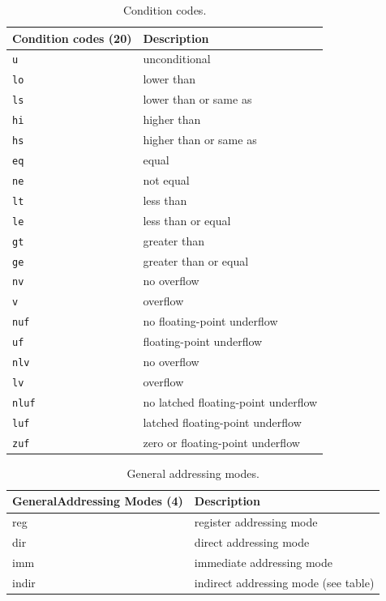 \begin{table}[!p]
\begin{center}
	\small
	\begin{tabular}{|p{3.0cm}|p{10.0cm}|}
	\hline
	\textbf{Condition codes (20)} & \textbf{Description}\\
	\hline
	\texttt{u} & unconditional \\
	\hline
	\texttt{lo} & lower than\\
	\hline
	\texttt{ls} & lower than or same as\\
	\hline
	\texttt{hi} & higher than\\
	\hline
	\texttt{hs} & higher than or same as\\
	\hline
	\texttt{eq} & equal\\
	\hline
	\texttt{ne} & not equal\\
	\hline
	\texttt{lt} & less than\\
	\hline
	\texttt{le} & less than or equal\\
	\hline
	\texttt{gt} & greater than\\
	\hline
	\texttt{ge} & greater than or equal\\
	\hline
	\texttt{nv} & no overflow\\
	\hline
	\texttt{v} & overflow\\
	\hline
	\texttt{nuf} & no floating-point underflow\\
	\hline
	\texttt{uf} & floating-point underflow\\
	\hline
	\texttt{nlv} & no overflow\\
	\hline
	\texttt{lv} & overflow\\
	\hline
	\texttt{nluf} & no latched floating-point underflow\\
	\hline
	\texttt{luf} & latched floating-point underflow\\
	\hline
	\texttt{zuf} & zero or floating-point underflow\\
	\hline
	\end{tabular}
	\caption{\label{table:tms320c3x_condition_codes} Condition codes.}
\end{center}
\end{table}

\begin{table}[!p]
\begin{center}
	\small
	\begin{tabular}{|p{3.0cm}|p{12.0cm}|}
	\hline
	\textbf{General\newline Addressing \newline Modes (4)} & \textbf{Description}\\
	\hline
	reg & register addressing mode\\
	\hline
	dir & direct addressing mode\\
	\hline
	imm & immediate addressing mode\\
	\hline
	indir & indirect addressing mode (see table)\\
	\hline
	\end{tabular}
	\caption{\label{table:tms320c3x_general_addressing_modes} General addressing modes.}
\end{center}
\end{table}

